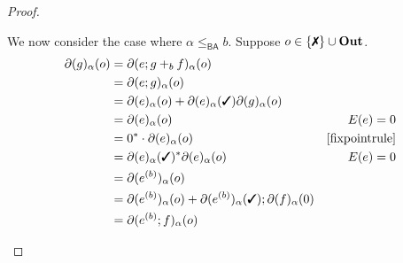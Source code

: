 \documentclass[a4paper,UKenglish,cleveref, autoref, thm-restate]{lipics-v2021}
\newcommand{\cmark}{\text{\ding{51}}}
\newcommand{\xmark}{\text{\ding{55}}}
\newcommand{\Out}{\textbf{\upshape{Out}}}
\newcommand{\BA}{\textsf{BA}}
\theoremstyle{plain}\newtheoremrep{thm}{Theorem}[section]
\begin{document}
\begin{toappendix}
\begin{proof}
\begin{enumerate}
				We now consider the case where $\alpha \leq_{\BA} b$. Suppose $o \in \{\xmark\} \cup \Out$.
				\begin{align*}
					\partial(g)_\alpha(o) &= \partial(e;g+_b f)_\alpha(o) &\\
					&= \partial(e;g)_\alpha(o)\\
					&= \partial(e)_\alpha(o)+ \partial(e)_\alpha(\cmark)\partial(g)_\alpha(o)\\  
					&= \partial(e)_\alpha(o) & E(e) = 0\\
					&= 0^*\cdot\partial(e)_\alpha(o) & \cref{fixpointrule}\\
					&= \partial(e)_\alpha(\cmark)^*\partial(e)_\alpha(o) & E(e) = 0\\   
					&= \partial(e^{(b)})_\alpha(o)\\
					&= \partial(e^{(b)})_\alpha(o) +  \partial(e^{(b)})_\alpha(\cmark);\partial(f)_\alpha(0)\\
					&= \partial(e^{(b)};f)_\alpha(o)\\
				\end{align*}
				

\end{enumerate}
\end{proof}
\end{toappendix}
\end{document}
